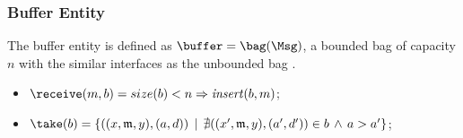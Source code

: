 \subsubsection{Buffer Entity}\label{timed::buffer}
The buffer entity is defined as $\buffer= \bag(\Msg)$, a bounded bag of capacity $n$ with the similar interfaces as the unbounded bag .  

\begin{itemize}
\item $\receive(m,b)={size(b)<n}\Rightarrow {\it insert}(b,m) $;
\item $\take(b)=\{((x,\mathfrak{m},y),(a,d))\,\mid\,\nexists ((x',\mathfrak{m},y),(a',d'))\in b\,\wedge \, a>a'\}$;
\end{itemize} 

